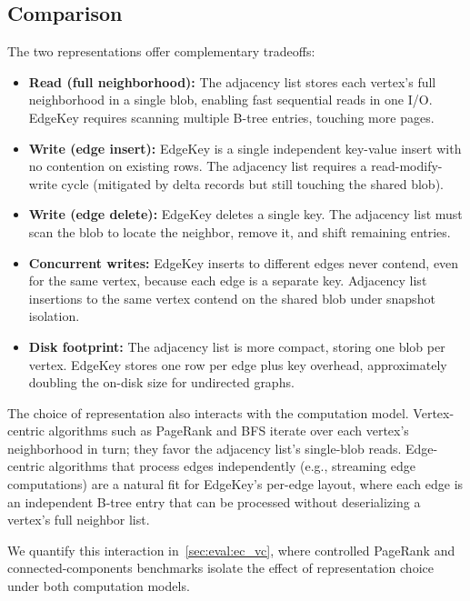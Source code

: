 

\subsection{Comparison}
\label{arch:comparison}
The two representations offer complementary tradeoffs:

\begin{itemize}
  \item \textbf{Read (full neighborhood):} The adjacency list stores each vertex's full neighborhood in a single blob, enabling fast sequential reads in one I/O. EdgeKey requires scanning multiple B-tree entries, touching more pages.

  \item \textbf{Write (edge insert):} EdgeKey is a single independent key-value insert with no contention on existing rows. The adjacency list requires a read-modify-write cycle (mitigated by  delta records but still touching the shared blob).

  \item \textbf{Write (edge delete):} EdgeKey deletes a single key. The adjacency list must scan the blob to locate the neighbor, remove it, and shift remaining entries.

  \item \textbf{Concurrent writes:} EdgeKey inserts to different edges never contend, even for the same vertex, because each edge is a separate key. Adjacency list insertions to the same vertex contend on the shared blob under snapshot isolation.

  \item \textbf{Disk footprint:} The adjacency list is more compact, storing one blob per vertex. EdgeKey stores one row per edge plus key overhead, approximately doubling the on-disk size for undirected graphs.
\end{itemize}

The choice of representation also interacts with the computation model.
Vertex-centric algorithms such as PageRank and \ac{BFS} iterate over each vertex's neighborhood in turn; they favor the adjacency list's single-blob reads.
Edge-centric algorithms that process edges independently (e.g., streaming edge computations) are a natural fit for EdgeKey's per-edge layout, where each edge is an independent B-tree entry that can be processed without deserializing a vertex's full neighbor list.

We quantify this interaction in~\autoref{sec:eval:ec_vc}, where controlled PageRank and connected-components benchmarks isolate the effect of representation choice under both computation models.

